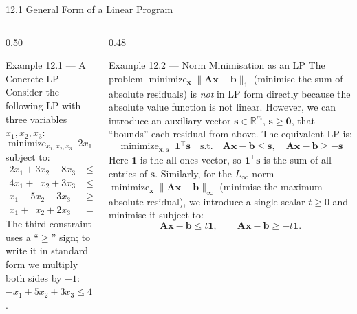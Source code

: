 \documentclass[aspectratio=169,10pt]{beamer}
\DeclareMathOperator*{\minimize}{minimize}
\newcommand{\xv}{\mathbf{x}}
\newcommand{\bv}{\mathbf{b}}
\newcommand{\Av}{\mathbf{A}}
\newcommand{\sv}{\mathbf{s}}
\begin{document}
\begin{frame}[allowframebreaks]{12.1 General Form of a Linear Program}
\framebreak

\begin{columns}
  \begin{column}{0.50\textwidth}
    \begin{exampleblock}{Example 12.1 --- A Concrete LP}
      Consider the following LP with three variables $x_1, x_2, x_3$:
      \[
        \minimize_{x_1,x_2,x_3}\;2x_1 - 3x_2 + 7x_3
      \]
      subject to:
      \[
        \begin{aligned}
          2x_1 + 3x_2 - 8x_3 &\le 5\\
          4x_1 + \phantom{0}x_2 + 3x_3 &\le 9\\
          x_1 - 5x_2 - 3x_3 &\ge -4\\
          x_1 + \phantom{0}x_2 + 2x_3 &= 1
        \end{aligned}
      \]
      The third constraint uses a ``$\ge$'' sign; to write it in standard form we
      multiply both sides by $-1$: $-x_1 + 5x_2 + 3x_3 \le 4$.
    \end{exampleblock}
  \end{column}
  \begin{column}{0.48\textwidth}
    \begin{exampleblock}{Example 12.2 --- Norm Minimisation as an LP}
      \small
      The problem $\minimize_\xv \|\Av\xv - \bv\|_1$ (minimise the sum of absolute
      residuals) is \emph{not} in LP form directly because the absolute value function
      is not linear.  However, we can introduce an auxiliary vector
      $\sv \in \mathbb{R}^m$, $\sv \ge \mathbf{0}$, that ``bounds'' each residual from
      above.  The equivalent LP is:
      \[
        \minimize_{\xv,\sv}\;\mathbf{1}^\top\sv
        \quad\text{s.t.}\quad
        \Av\xv - \bv \le \sv,\quad
        \Av\xv - \bv \ge -\sv
      \]
      Here $\mathbf{1}$ is the all-ones vector, so $\mathbf{1}^\top\sv$ is the sum of
      all entries of $\sv$.  Similarly, for the $L_\infty$ norm
      $\minimize_\xv \|\Av\xv - \bv\|_\infty$ (minimise the maximum absolute residual),
      we introduce a single scalar $t \ge 0$ and minimise it subject to:
      \[
        \Av\xv - \bv \le t\mathbf{1},\qquad \Av\xv - \bv \ge -t\mathbf{1}.
      \]
    \end{exampleblock}
  \end{column}
\end{columns}

\end{frame}
\end{document}
